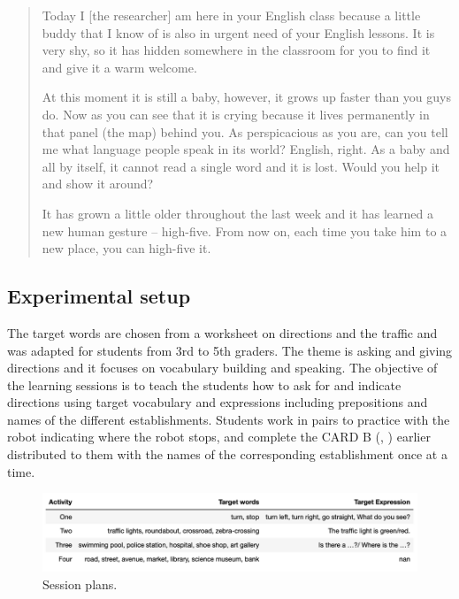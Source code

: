 \documentclass[english]{textolivre}
\begin{document}
\begin{quote}
    Today I [the researcher] am here in your English class because a little buddy that I know of is also in urgent need of your English lessons. It is very shy, so it has hidden somewhere in the classroom for you to find it and give it a warm welcome.
    
    At this moment it is still a baby, however, it grows up faster than you guys do. Now as you can see that it is crying because it lives permanently in that panel (the map) behind you. As perspicacious as you are, can you tell me what language people speak in its world?  English, right. As a baby and all by itself, it cannot read a single word and it is lost. Would you help it and show it around?
    
    It has grown a little older throughout the last week and it has learned a new human gesture – high-five. From now on, each time you take him to a new place, you can high-five it.
\end{quote}

\subsection{Experimental setup}\label{sec-organizacao-latex}
The target words are chosen from a worksheet on directions and the traffic and was adapted for students from 3rd to 5th graders. The theme is asking and giving directions and it focuses on vocabulary building and speaking. The objective of the learning sessions is to teach the students how to ask for and indicate directions using target vocabulary and expressions including prepositions and names of the different establishments. Students work in pairs to practice with the robot indicating where the robot stops, and complete the CARD B (, ) earlier distributed to them with the names of the corresponding establishment once at a time.

\begin{figure}[htbp]
\centering
\begin{minipage}{.85\textwidth}
 \includegraphics[width=\textwidth]{Fig4.png}
 \caption{Session plans.}
 \label{fig04}
\end{minipage}
\end{figure}
\end{document}
